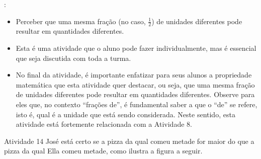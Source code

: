 \begin{multicols}{2}
  \vspace{.1cm}:

  \begin{itemize} %
    \item       Perceber que uma mesma fração (no caso, $\frac{1}{2}$) de unidades diferentes pode resultar em quantidades diferentes.
\end{itemize} %


  \vspace{.1cm}

  \vspace{.1cm}

  \begin{itemize} %
    \item       Esta é uma atividade que o aluno pode fazer individualmente, mas é essencial que seja discutida com toda a turma.
    \item       No final da atividade, é importante enfatizar para seus alunos a propriedade matemática que esta atividade quer destacar, ou seja, que uma mesma fração de unidades diferentes pode resultar em quantidades diferentes. Observe para eles que, no contexto       ``frações de'', é fundamental saber a que o       ``de''     se refere, isto é, qual é a unidade que está sendo considerada. Neste sentido, esta atividade está fortemente relacionada com a Atividade 8.
\end{itemize} %


  \vspace{.1cm}



\begin{resposta*}{Atividade 14}
  José está certo se a pizza da qual comeu metade for maior do que a pizza da qual Ella comeu metade, como ilustra a figura a seguir.
  \begin{center}


\end{center}
\end{resposta*}
\end{multicols}
